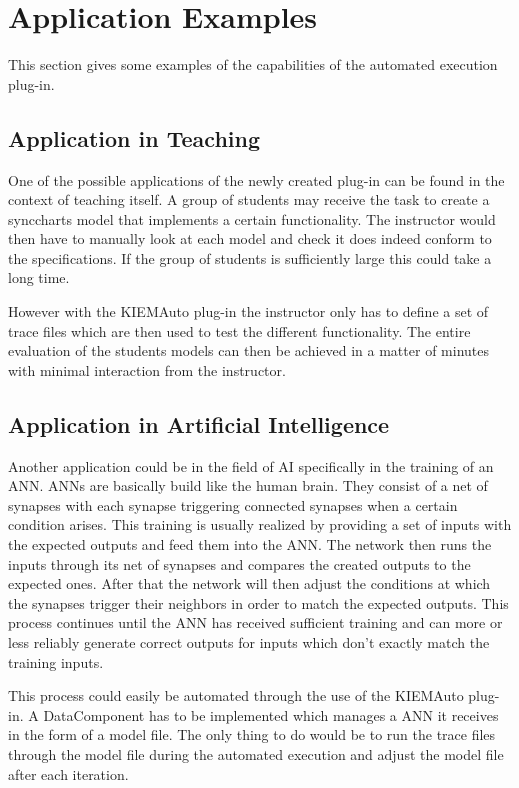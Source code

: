 \section{Application Examples}
This section gives some examples of the capabilities of the automated execution plug-in.

\subsection{Application in Teaching}
One of the possible applications of the newly created plug-in can be found in the context of teaching itself.
A group of students may receive the task to create a synccharts model that implements a certain functionality.
The instructor would then have to manually look at each model and check it does indeed conform to the 
specifications. If the group of students is sufficiently large this could take a long time.

However with the \ac{KIEMAuto} plug-in the instructor only has to define a set of trace files which are then
used to test the different functionality. The entire evaluation of the students models can then be achieved
in a matter of minutes with minimal interaction from the instructor.

\subsection{Application in Artificial Intelligence}
Another application could be in the field of \ac{AI} specifically in the training of an \ac{ANN}. \ac{ANN}s
are basically build like the human brain. They consist of a net of synapses with each synapse triggering
connected synapses when a certain condition arises. This training is usually realized by providing a set
of inputs with the expected outputs and feed them into the \ac{ANN}. The network then runs the inputs through
its net of synapses and compares the created outputs to the expected ones. After that the network will then
adjust the conditions at which the synapses trigger their neighbors in order to match the expected outputs.
This process continues until the \ac{ANN} has received sufficient training and can more or less reliably
generate correct outputs for inputs which don't exactly match the training inputs.

This process could easily be automated through the use of the \ac{KIEMAuto} plug-in. A DataComponent has to
be implemented which manages a \ac{ANN} it receives in the form of a model file. The only thing to do would
be to run the trace files through the model file during the automated execution and adjust the model file
after each iteration. 